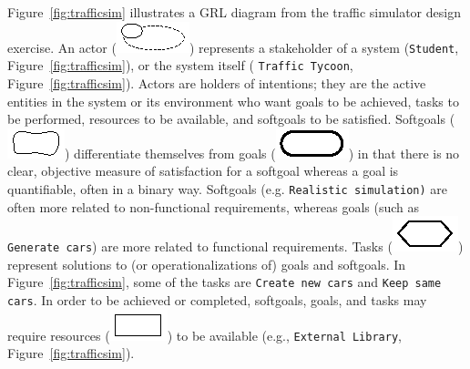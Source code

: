 Figure~\ref{fig:trafficsim} illustrates a GRL diagram from the traffic simulator design exercise. An actor (\includegraphics[scale=1]{img/actor}) represents a stakeholder of a system (\texttt{Student}, Figure~\ref{fig:trafficsim}), or the system itself ( \texttt{Traffic Tycoon}, Figure~\ref{fig:trafficsim}). Actors are holders of intentions; they are the active entities in the system or its environment who want goals to be achieved, tasks to be performed, resources to be available, and softgoals to be satisfied. Softgoals (\includegraphics[scale=1]{img/softgoal}) differentiate themselves from goals (\includegraphics[scale=1]{img/goal}) in that there is no clear, objective measure of satisfaction for a softgoal whereas a goal is quantifiable, often in a binary way. Softgoals (e.g.  \texttt{Realistic simulation)} are often more related to non-functional requirements, whereas goals (such as  \texttt{Generate cars}) are more related to functional requirements. Tasks (\includegraphics[scale=1]{img/task}) represent solutions to (or operationalizations of) goals and softgoals. In Figure~\ref{fig:trafficsim}, some of the tasks are  \texttt{Create new cars} and \texttt{Keep same cars}. In order to be achieved or completed, softgoals, goals, and tasks may require resources (\includegraphics[scale=1]{img/resource}) to be available (e.g., \texttt{External Library}, Figure~\ref{fig:trafficsim}).

